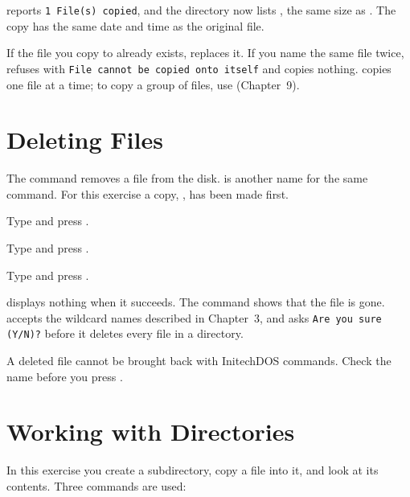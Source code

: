 
 reports \texttt{1 File(s) copied}, and the directory now lists
, the same size as .
The copy has the same date and time as the original file.

If the file you copy to already exists,  replaces it.  If you
name the same file twice,  refuses with \texttt{File cannot be
copied onto itself} and copies nothing.   copies one file at a
time; to copy a group of files, use  (Chapter~9).

\section{Deleting Files}
The  command removes a file from the disk.   is another
name for the same command.  For this exercise a copy, , has
been made first.
\begin{Steps}
\item Type  and press .
\item Type  and press .
\item Type  and press .
\end{Steps}


 displays nothing when it succeeds.  The  command shows
that the file is gone.   accepts the wildcard names described in
Chapter~3, and asks \texttt{Are you sure (Y/N)?} before it deletes every
file in a directory.

\begin{Important}
A deleted file cannot be brought back with InitechDOS commands.  Check the
name before you press .
\end{Important}

\section{Working with Directories}
In this exercise you create a subdirectory, copy a file into it, and look at
its contents.  Three commands are used:

